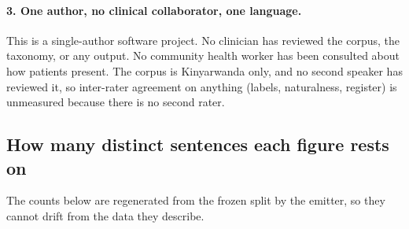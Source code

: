 \paragraph{3. One author, no clinical collaborator, one language.} This is a
single-author software project. No clinician has reviewed the corpus, the
taxonomy, or any output. No community health worker has been consulted about how
patients present. The corpus is Kinyarwanda only, and no second speaker has
reviewed it, so inter-rater agreement on anything (labels, naturalness,
register) is unmeasured because there is no second rater.

\subsection{How many distinct sentences each figure rests on}
\label{sec:limits:base}

The counts below are regenerated from the frozen split by the emitter, so they
cannot drift from the data they describe.
%
\begingroup
\renewcommand{\subsection}[1]{}%
\renewcommand{\label}[1]{}%

\endgroup

\subsection{The paper's critique applies to the paper's own specification}

